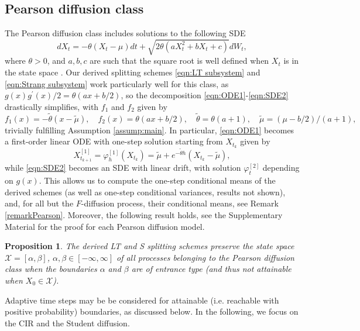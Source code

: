 \documentclass[a4paper,12pt]{article}
\numberwithin{equation}{section}
\theoremstyle{plain}
\newtheorem{proposition}[theorem]{Proposition}
\theoremstyle{definition}
\begin{document}
\subsection{Pearson diffusion class}\label{resultsPearson}
The Pearson diffusion class includes solutions to the following SDE
\begin{equation*}\label{eqn:Pearson diffusion}
d X_t=-\theta\left(X_t-\mu\right) d t+\sqrt{2 \theta\left(a X_t^2+b X_t+c\right)} d W_t,
\end{equation*}
where $\theta>0$, and $a,b,c$ are such that the square root is well defined when $X_t$ is in the state space \cite{forman_pearson_2008}. 
Our derived 
splitting schemes \eqref{eqn:LT subsystem} and \eqref{eqn:Strang subsystem} work particularly well for this class, as 
    $g(x)g^{\prime}(x)/2=\theta( a x+ b/2)$, 
so the decomposition \eqref{eqn:ODE1}-\eqref{eqn:SDE2} drastically simplifies, with $f_1$ and $f_2$ given by
\[
f_1(x)=-\tilde\theta(x-\tilde\mu),\quad f_2(x)=\theta (ax+b/2), \quad \tilde\theta=\theta(a+1), \quad \tilde\mu=(\mu-b/2)/(a+1),
\]
trivially fulfilling Assumption \ref{assump:main}. In particular, \eqref{eqn:ODE1} becomes a first-order linear ODE with one-step solution starting from $X_{t_k}$ given by 
\begin{equation}\label{ODEsolPearson}
X^{[1]}_{t_{k+1}}=\varphi^{[1]}_h(X_{t_k})=\tilde\mu+e^{-\tilde\theta h}(X_{t_k}-\tilde\mu),
\end{equation}
while \eqref{eqn:SDE2} becomes an SDE with linear drift, with solution $\varphi^{[2]}_t$ depending on $g(x)$. This allows us to compute the one-step conditional means of the derived schemes (as well as one-step conditional variances, results not shown), and, for all but the $F$-diffusion process, their conditional means, see Remark \ref{remarkPearson}. Moreover, the following result holds, see the Supplementary Material \cite{Fangetal26} for the proof for each Pearson diffusion model.
 \begin{proposition}
The derived \textrm{LT} and \textrm{S} splitting schemes preserve the state space $\mathcal{X}=[\alpha,\beta]$, $\alpha,\beta \in [-\infty,\infty]$ of all processes belonging to the Pearson diffusion class when the boundaries $\alpha$ and $\beta$ are of entrance type (and thus not attainable when $X_0\in\mathcal{X}$).  
 \end{proposition}
Adaptive time steps may be be considered for attainable  (i.e. reachable with positive probability) boundaries, as discussed below. In the following, we focus on the CIR and the Student diffusion.
\end{document}
